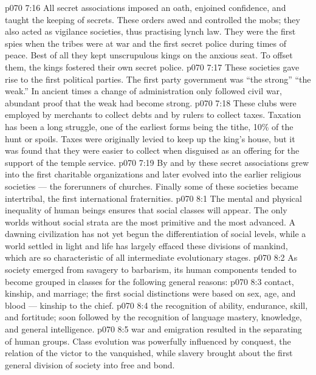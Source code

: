 \vs p070 7:16 All secret associations imposed an oath, enjoined confidence, and taught the keeping of secrets. These orders awed and controlled the mobs; they also acted as vigilance societies, thus practising lynch law. They were the first spies when the tribes were at war and the first secret police during times of peace. Best of all they kept unscrupulous kings on the anxious seat. To offset them, the kings fostered their own secret police.
\vs p070 7:17 These societies gave rise to the first political parties. The first party government was “the strong”  “the weak.” In ancient times a change of administration only followed civil war, abundant proof that the weak had become strong.
\vs p070 7:18 These clubs were employed by merchants to collect debts and by rulers to collect taxes. Taxation has been a long struggle, one of the earliest forms being the tithe, 10\% of the hunt or spoils. Taxes were originally levied to keep up the king’s house, but it was found that they were easier to collect when disguised as an offering for the support of the temple service.
\vs p070 7:19 By and by these secret associations grew into the first charitable organizations and later evolved into the earlier religious societies --- the forerunners of churches. Finally some of these societies became intertribal, the first international fraternities.
\vs p070 8:1 The mental and physical inequality of human beings ensures that social classes will appear. The only worlds without social strata are the most primitive and the most advanced. A dawning civilization has not yet begun the differentiation of social levels, while a world settled in light and life has largely effaced these divisions of mankind, which are so characteristic of all intermediate evolutionary stages.
\vs p070 8:2 As society emerged from savagery to barbarism, its human components tended to become grouped in classes for the following general reasons:
\vs p070 8:3 \bibnobreakspace {} contact, kinship, and marriage; the first social distinctions were based on sex, age, and blood --- kinship to the chief.
\vs p070 8:4 \bibnobreakspace {} the recognition of ability, endurance, skill, and fortitude; soon followed by the recognition of language mastery, knowledge, and general intelligence.
\vs p070 8:5 \bibnobreakspace {} war and emigration resulted in the separating of human groups. Class evolution was powerfully influenced by conquest, the relation of the victor to the vanquished, while slavery brought about the first general division of society into free and bond.
